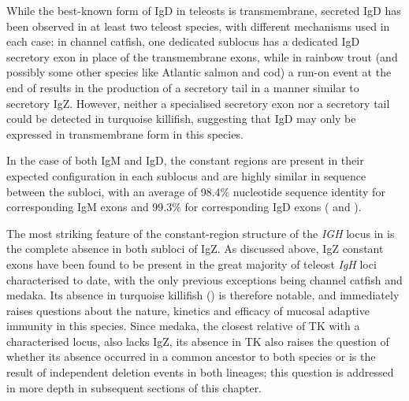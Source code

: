 	While the best-known form of IgD in teleosts is transmembrane, secreted IgD has been observed in at least two teleost species, with different mechanisms used in each case: in channel catfish, one dedicated sublocus has a dedicated IgD secretory exon in place of the transmembrane exons, while in rainbow trout (and possibly some other species like Atlantic salmon and cod) a run-on event at the end of  results in the production of a secretory tail in a manner similar to secretory IgZ. However, neither a specialised secretory exon nor a  secretory tail could be detected in turquoise killifish, suggesting that IgD may only be expressed in transmembrane form in this species. %
	
	In the case of both IgM and IgD, the constant regions are present in their expected configuration in each sublocus and are highly similar in sequence between the subloci, with an average of 98.4\% nucleotide sequence identity for corresponding IgM exons and 99.3\% for corresponding IgD exons ( and ).

	The most striking feature of the constant-region structure of the \textit{IGH} locus in \Nfu is the complete absence in both subloci of IgZ. As discussed above, IgZ constant exons have been found to be present in the great majority of teleost \textit{IgH} loci characterised to date, with the only previous exceptions being channel catfish and medaka. Its absence in turquoise killifish () is therefore notable, and immediately raises questions about the nature, kinetics and efficacy of mucosal adaptive immunity in this species. Since medaka, the closest relative of TK with a characterised locus, also lacks IgZ, its absence in TK also raises the question of whether its absence occurred in a common ancestor to both species or is the result of independent deletion events in both lineages; this question is addressed in more depth in subsequent sections of this chapter. %

	

